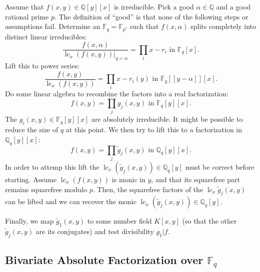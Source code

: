 \documentclass[11pt,reqno]{amsart}
\numberwithin{equation}{section}
\begin{document}
Assume that $f(x,y) \in \mathbb{Q}[y][x]$ is irreducible. Pick a good $\alpha
\in \mathbb{Q}$ and a good rational prime $p$. The definition of ``good'' is
that none of the following steps or assumptions fail. Determine an
$\mathbb{F}_q = \mathbb{F}_{p^?}$ such that $f(x,\alpha)$ splits completely
into distinct linear irreducibles:
\begin{equation*}
\frac{f(x,\alpha)}{\operatorname{lc}_x(f(x,y)) |_{y=\alpha}} = \prod_i x - r_i
\text{ in } \mathbb{F}_q[x]\text{.}
\end{equation*}
Lift this to power series:
\begin{equation*}
\frac{f(x,y)}{\operatorname{lc}_x(f(x,y))} = \prod_i x - r_i(y) \text{ in }
\mathbb{F}_q[[y-\alpha]][x]\text{.}
\end{equation*}
Do some linear algebra to recombine the factors into a real factorization:
\begin{equation*}
f(x,y) = \prod_j g_j(x,y) \text{ in } \mathbb{F}_q[y][x]\text{.}
\end{equation*}
The $g_i(x,y) \in \mathbb{F}_q[y][x]$ are absolutely irreducible. It might be
possible to reduce the size of $q$ at this point. We then try to lift this to a
factorization in $\mathbb{Q}_q[y][x]$:
\begin{equation*}
f(x,y) = \prod_j \widetilde{g}_j(x,y) \text{ in } \mathbb{Q}_q[y][x]\text{.}
\end{equation*}
In order to attemp this lift the $\operatorname{lc}_x(\widetilde{g}_j(x,y)) \in
\mathbb{Q}_q[y]$ must be correct before starting. Assume
$\operatorname{lc}_x(f(x,y))$ is monic in $y$, and that its squarefree part
remains squarefree modulo $p$. Then, the squarefree factors of the
$\operatorname{lc}_x \widetilde{g}_j(x,y)$ can be lifted and we can recover the
monic $\operatorname{lc}_x(\widetilde{g}_j(x,y)) \in \mathbb{Q}_q[y]$.

Finally, we map $\widetilde{g}_1(x,y)$ to some number field $K[x,y]$ (so that
the other $\widetilde{g}_j(x,y)$ are its conjugates) and test divisibility
$g_1|f$.

\subsection{Bivariate Absolute Factorization over $\mathbb{F}_q$}
\end{document}
